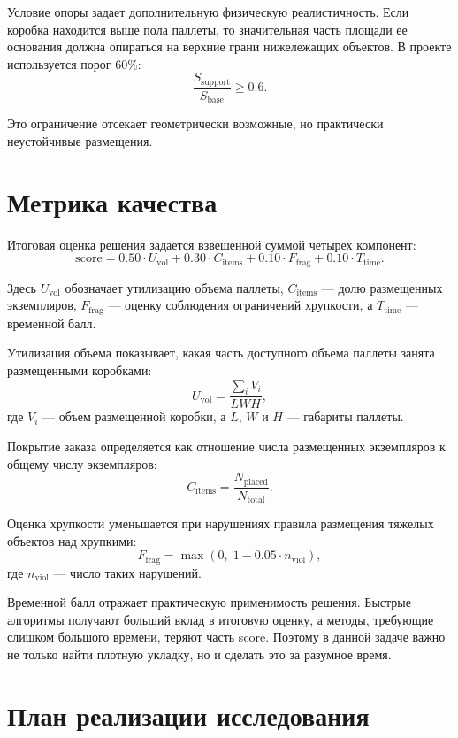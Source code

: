 \documentclass[14pt,a4paper]{extarticle}
\begin{document}
Условие опоры задает дополнительную физическую реалистичность. Если коробка находится выше пола паллеты, то значительная часть площади ее основания должна опираться на верхние грани нижележащих объектов. В проекте используется порог 60\%:
\[
\frac{S_{\text{support}}}{S_{\text{base}}} \ge 0.6.
\]

Это ограничение отсекает геометрически возможные, но практически неустойчивые размещения.

\pagebreak

\section{Метрика качества}

Итоговая оценка решения задается взвешенной суммой четырех компонент:
\[
\text{score} =
0.50 \cdot U_{\text{vol}} +
0.30 \cdot C_{\text{items}} +
0.10 \cdot F_{\text{frag}} +
0.10 \cdot T_{\text{time}}.
\]

Здесь $U_{\text{vol}}$ обозначает утилизацию объема паллеты, $C_{\text{items}}$ --- долю размещенных экземпляров, $F_{\text{frag}}$ --- оценку соблюдения ограничений хрупкости, а $T_{\text{time}}$ --- временной балл.

Утилизация объема показывает, какая часть доступного объема паллеты занята размещенными коробками:
\[
U_{\text{vol}} = \frac{\sum_i V_i}{LWH},
\]
где $V_i$ --- объем размещенной коробки, а $L$, $W$ и $H$ --- габариты паллеты.

Покрытие заказа определяется как отношение числа размещенных экземпляров к общему числу экземпляров:
\[
C_{\text{items}} = \frac{N_{\text{placed}}}{N_{\text{total}}}.
\]

Оценка хрупкости уменьшается при нарушениях правила размещения тяжелых объектов над хрупкими:
\[
F_{\text{frag}} = \max(0,\; 1 - 0.05 \cdot n_{\text{viol}}),
\]
где $n_{\text{viol}}$ --- число таких нарушений.

Временной балл отражает практическую применимость решения. Быстрые алгоритмы получают больший вклад в итоговую оценку, а методы, требующие слишком большого времени, теряют часть score. Поэтому в данной задаче важно не только найти плотную укладку, но и сделать это за разумное время.

\pagebreak

\section{План реализации исследования}
\end{document}
